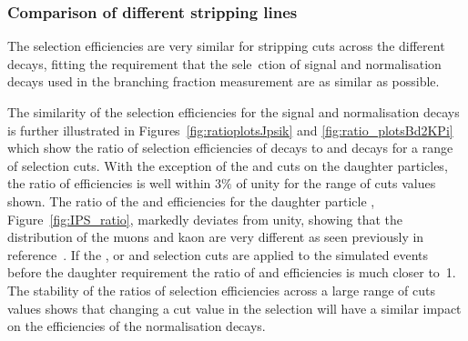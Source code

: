 \subsubsection*{Comparison of different stripping lines}
The selection efficiencies are very similar for stripping cuts across the different decays, fitting the requirement that the sele\
ction of signal and normalisation decays used in the branching fraction measurement are as similar as possible. 

The similarity of the selection efficiencies for the signal and normalisation decays is further illustrated in Figures~\ref{fig:ratioplotsJpsik} and \ref{fig:ratio_plotsBd2KPi} which show the ratio of selection efficiencies of \bsmumu decays to \bujpsik and \bdkpi decays for a range of selection cuts. With the exception of the \bsmumu and \bujpsik \chiIP cuts on the daughter particles, the ratio of efficiencies is well within $3\%$ of unity for the range of cuts values shown. The ratio of the \bsmumu and \bujpsik efficiencies for the daughter particle \chiIP, Figure~\ref{fig:IPS_ratio}, markedly deviates from unity, showing that the \chiIP distribution of the muons and kaon are very different as seen previously in reference~\cite{Diego}. If the \chiFD, \bs or \jpsi \chiIP and \chivtx selection cuts are applied to the simulated events before the daughter \chiIP requirement the ratio of \bmumu and \bujpsik efficiencies is much closer to~1. The stability of the ratios of selection efficiencies across a large range of cuts values shows that changing a cut value in the \bmumu selection will have a similar impact on the efficiencies of the normalisation decays. 


